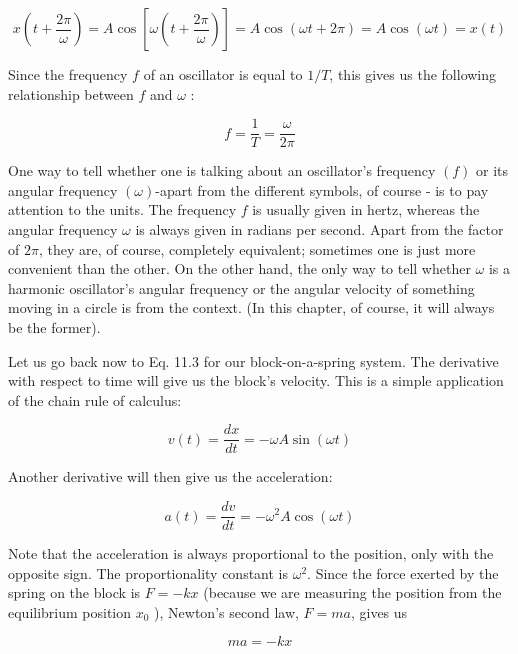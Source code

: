 \documentclass[10pt]{article}
\begin{document}
\begin{equation*}
x\left(t+\frac{2 \pi}{\omega}\right)=A \cos \left[\omega\left(t+\frac{2 \pi}{\omega}\right)\right]=A \cos (\omega t+2 \pi)=A \cos (\omega t)=x(t) \tag{11.5}
\end{equation*}


Since the frequency $f$ of an oscillator is equal to $1 / T$, this gives us the following relationship between $f$ and $\omega$ :


\begin{equation*}
f=\frac{1}{T}=\frac{\omega}{2 \pi} \tag{11.6}
\end{equation*}


One way to tell whether one is talking about an oscillator's frequency $(f)$ or its angular frequency $(\omega)$-apart from the different symbols, of course - is to pay attention to the units. The frequency $f$ is usually given in hertz, whereas the angular frequency $\omega$ is always given in radians per second. Apart from the factor of $2 \pi$, they are, of course, completely equivalent; sometimes one is just more convenient than the other. On the other hand, the only way to tell whether $\omega$ is a harmonic oscillator's angular frequency or the angular velocity of something moving in a circle is from the context. (In this chapter, of course, it will always be the former).

Let us go back now to Eq. 11.3 for our block-on-a-spring system. The derivative with respect to time will give us the block's velocity. This is a simple application of the chain rule of calculus:


\begin{equation*}
v(t)=\frac{d x}{d t}=-\omega A \sin (\omega t) \tag{11.7}
\end{equation*}


Another derivative will then give us the acceleration:


\begin{equation*}
a(t)=\frac{d v}{d t}=-\omega^{2} A \cos (\omega t) \tag{11.8}
\end{equation*}


Note that the acceleration is always proportional to the position, only with the opposite sign. The proportionality constant is $\omega^{2}$. Since the force exerted by the spring on the block is $F=-k x$ (because we are measuring the position from the equilibrium position $x_{0}$ ), Newton's second law, $F=m a$, gives us


\begin{equation*}
m a=-k x \tag{11.9}
\end{equation*}
\end{document}
